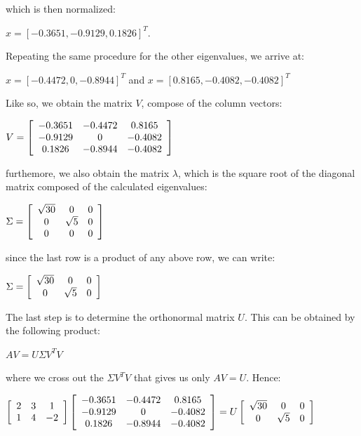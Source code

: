 \documentclass[]{article}
\begin{document}
which is then normalized: 

\centerline {
	$x = [-0.3651, -0.9129, 0.1826]^T$.
}

Repeating the same procedure for the other eigenvalues, we arrive at: 

\centerline {
	$x = [-0.4472, 0, -0.8944]^T$ and $x = [0.8165, -0.4082, -0.4082]^T$
}

Like so, we obtain the matrix $V$, compose of the column vectors: 

\centerline{ $V = \left[ {\begin{array}{*{20}c}
		-0.3651 & -0.4472 & 0.8165 \\
		-0.9129 & 0 & -0.4082 \\ 
		0.1826 & -0.8944 & -0.4082   
		\end{array} } \right]$ 
}
	
furthemore, we also obtain the matrix $\lambda$, which is the square root of the diagonal matrix composed of the calculated eigenvalues: 

\centerline{ $\Sigma = \left[ {\begin{array}{*{20}c}
		\sqrt{30} & 0 & 0 \\
		0 & \sqrt{5} & 0 \\ 
		0 & 0 & 0   
		\end{array} } \right]$ 
}

since the last row is a product of any above row, we can write:

\centerline{ $\Sigma = \left[ {\begin{array}{*{20}c}
		\sqrt{30} & 0 & 0 \\
		0 & \sqrt{5} & 0   
		\end{array} } \right]$ 
}

The last step is to determine the orthonormal matrix $U$. This can be obtained by the following product:

\centerline {
	$AV = U \Sigma V^TV$
} 

where we cross out the $\Sigma V^TV$ that gives us only $AV = U$. Hence:

\centerline{ $\left[ {\begin{array}{*{20}c}
		2 & 3 & 1 \\
		1 & 4 & -2   
		\end{array} } \right] 
			\left[ {\begin{array}{*{20}c}
		-0.3651 & -0.4472 & 0.8165 \\
		-0.9129 & 0 & -0.4082 \\ 
		0.1826 & -0.8944 & -0.4082  
		\end{array} } \right] = U \left[ {\begin{array}{*{20}c}
		\sqrt{30} & 0 & 0 \\
		0 & \sqrt{5} & 0   
		\end{array} } \right]$ 
}
\end{document}
